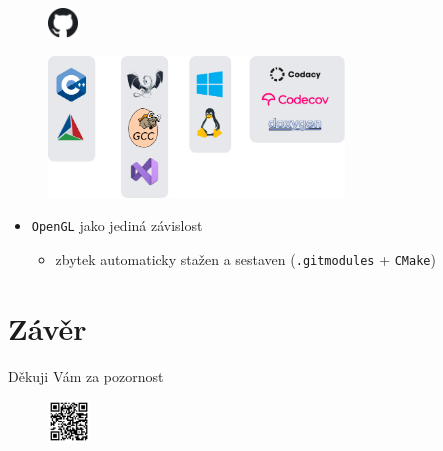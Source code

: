 \documentclass[compress]{beamer}
\begin{document}
\begin{frame}
	\vspace{-0.5cm}
	\begin{figure}
		\centering
		\includegraphics[width=0.07\textwidth]{img/logos/github.pdf}
	\end{figure}
	\centering
	\vspace{-0.4cm}
	\href{https://github.com/silhavyj/ZeroMate}{}
	\vspace{-0.1cm}
	\noindent\makebox[\linewidth]{\rule{\textwidth}{0.4pt}}
	\begin{figure}
		\centering
		\includegraphics[width=0.7\textwidth]{img/logos/logos.pdf}
	\end{figure}
	\begin{itemize}
		\item \texttt{OpenGL} jako jediná závislost
			\begin{itemize}
				\item zbytek automaticky stažen a sestaven (\texttt{.gitmodules} + \texttt{CMake})
			\end{itemize}
	\end{itemize}
\end{frame}

\section{Závěr}

\begin{frame}
  \centering \Large
  Děkuji Vám za pozornost\\
  \href{https://github.com/silhavyj/ZeroMate}{}
  \begin{figure}
  	\centering
  	\includegraphics[width=0.10\textwidth]{img/qr-code.pdf}
  \end{figure}
\end{frame}
\end{document}
